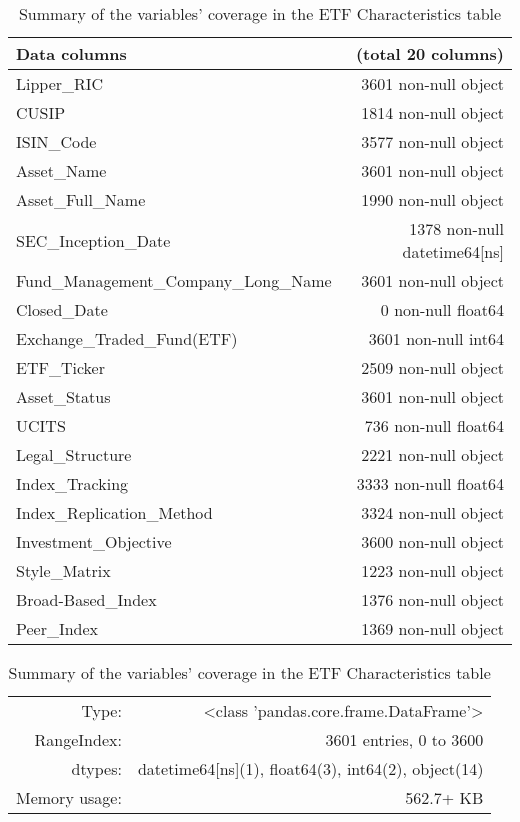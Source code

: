 {\linespread{1.0}
\begin{table}[htbp]
\centering
  \caption{Summary of the variables' coverage in the ETF Characteristics table}
  \label{tab:ETFCharacteristics}
  \begin{tabular}{lr}
    \toprule
    Data columns & (total 20 columns)\\
    \midrule
    Lipper\_RIC & 3601 non-null object\\
    CUSIP & 1814 non-null object\\
    ISIN\_Code & 3577 non-null object\\
    Asset\_Name & 3601 non-null object\\
    Asset\_Full\_Name & 1990 non-null object\\
    SEC\_Inception\_Date & 1378 non-null datetime64[ns]\\
    Fund\_Management\_Company\_Long\_Name & 3601 non-null object\\
    Closed\_Date & 0 non-null float64\\
    Exchange\_Traded\_Fund(ETF) & 3601 non-null int64\\
    ETF\_Ticker & 2509 non-null object\\
    Asset\_Status & 3601 non-null object\\
    UCITS & 736 non-null float64\\
    Legal\_Structure & 2221 non-null object\\
    Index\_Tracking & 3333 non-null float64\\
    Index\_Replication\_Method & 3324 non-null object\\
    Investment\_Objective & 3600 non-null object\\
    Style\_Matrix & 1223 non-null object\\
    Broad-Based\_Index & 1376 non-null object\\
    Peer\_Index & 1369 non-null object\\
    \bottomrule
  \end{tabular}
  {\itshape
  \begin{tabular}{rr}
  Type: & <class 'pandas.core.frame.DataFrame'>\\
  RangeIndex: & 3601 entries, 0 to 3600\\
  dtypes: & datetime64[ns](1), float64(3), int64(2), object(14)\\
  Memory usage: & 562.7+ KB
  \end{tabular}}
\end{table}
}
